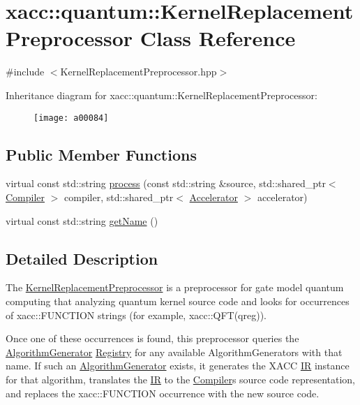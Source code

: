 \hypertarget{a00084}{}\section{xacc\+:\+:quantum\+:\+:Kernel\+Replacement\+Preprocessor Class Reference}
\label{a00084}


{\ttfamily \#include $<$Kernel\+Replacement\+Preprocessor.\+hpp$>$}

Inheritance diagram for xacc\+:\+:quantum\+:\+:Kernel\+Replacement\+Preprocessor\+:\begin{figure}[H]
\begin{center}
\leavevmode
\texttt{[image: a00084]}
\end{center}
\end{figure}
\subsection*{Public Member Functions}
\begin{DoxyCompactItemize}
\item 
virtual const std\+::string \hyperlink{a00084_ad4f9ba1f83ea45ed376f36e3853c668d}{process} (const std\+::string \&source, std\+::shared\+\_\+ptr$<$ \hyperlink{a00034}{Compiler} $>$ compiler, std\+::shared\+\_\+ptr$<$ \hyperlink{a00017}{Accelerator} $>$ accelerator)
\item 
virtual const std\+::string \hyperlink{a00084_af74db6b7f3adeb7d203777f5ce450491}{get\+Name} ()
\end{DoxyCompactItemize}


\subsection{Detailed Description}
The \hyperlink{a00084}{Kernel\+Replacement\+Preprocessor} is a preprocessor for gate model quantum computing that analyzing quantum kernel source code and looks for occurrences of \textquotesingle{}xacc\+::\+F\+U\+N\+C\+T\+I\+ON\textquotesingle{} strings (for example, xacc\+::\+Q\+F\+T(qreg)).

Once one of these occurrences is found, this preprocessor queries the \hyperlink{a00020}{Algorithm\+Generator} \hyperlink{a00111}{Registry} for any available Algorithm\+Generators with that name. If such an \hyperlink{a00020}{Algorithm\+Generator} exists, it generates the X\+A\+CC \hyperlink{a00077}{IR} instance for that algorithm, translates the \hyperlink{a00077}{IR} to the \hyperlink{a00034}{Compiler}\textquotesingle{}s source code representation, and replaces the \textquotesingle{}xacc\+::\+F\+U\+N\+C\+T\+I\+ON\textquotesingle{} occurrence with the new source code. 

